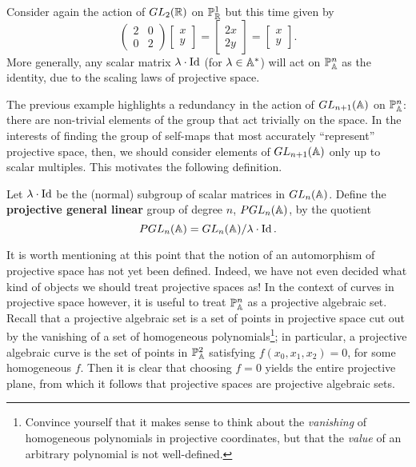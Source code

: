 \documentclass{../../mathnotes}
\begin{document}
\begin{exmp}
    Consider again the action of $GL_2(\mathbb{R})$ on $\mathbb{P}^1_{\mathbb{R}}$ but this time given by 
    \[\begin{pmatrix}
        2&0\\
        0&2
    \end{pmatrix}
    \begin{bmatrix}
        x\\y
    \end{bmatrix}
    =
    \begin{bmatrix}
        2x\\2y
    \end{bmatrix}
    =
    \begin{bmatrix}
        x\\y    
    \end{bmatrix}.\] More generally, any scalar matrix $\lambda\cdot\operatorname{Id}$ (for $\lambda\in\mathbb{A}^*$) will act on $\mathbb{P}^n_{\mathbb{A}}$
    as the identity, due to the scaling laws of projective space.
\end{exmp}

The previous example highlights a redundancy in the action of $GL_{n+1}(\mathbb{A})$ on $\mathbb{P}^n_{\mathbb{A}}$: there are non-trivial elements of the group
that act trivially on the space. In the interests of finding the group of self-maps that most accurately ``represent'' projective space, then,
we should consider elements of $GL_{n+1}(\mathbb{A})$ only up to scalar multiples. This motivates the following definition.

\begin{defn}
    Let $\lambda\cdot \operatorname{Id}$ be the (normal) subgroup of scalar matrices in $GL_{n}(\mathbb{A})$. Define the \textbf{projective general linear} group
    of degree $n$, $PGL_n(\mathbb{A})$, by the quotient
    \[PGL_{n}(\mathbb{A})=GL_n(\mathbb{A})/\lambda\cdot\operatorname{Id}.\]
\end{defn}

It is worth mentioning at this point that the notion of an automorphism of projective space has not yet been defined. Indeed, we have not
even decided what kind of objects we should treat projective spaces as! In the context of curves in projective space however,
it is useful to treat $\mathbb{P}^n_{\mathbb{A}}$ as a projective algebraic set. Recall that a projective algebraic set is a set of points in projective
space cut out by the vanishing of a set of homogeneous polynomials\footnote{Convince yourself that it makes sense to think about the
    \textit{vanishing} of homogeneous polynomials in projective coordinates, but that the \textit{value} of an arbitrary polynomial is not well-defined.};
in particular, a projective algebraic curve is the set of points in
$\mathbb{P}^2_{\mathbb{A}}$ satisfying $f(x_0,x_1,x_2)=0$, for some homogeneous $f$. Then it is clear that choosing $f=0$ yields the entire projective plane,
from which it follows that projective spaces are projective algebraic sets.
\end{document}
